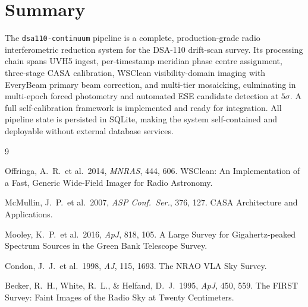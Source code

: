 \documentclass[12pt,a4paper]{article}
\begin{document}
\section{Summary}

The \texttt{dsa110-continuum} pipeline is a complete, production-grade radio
interferometric reduction system for the DSA-110 drift-scan survey.  Its
processing chain spans UVH5 ingest, per-timestamp meridian phase centre
assignment, three-stage CASA calibration, WSClean visibility-domain imaging
with EveryBeam primary beam correction, and multi-tier mosaicking, culminating
in multi-epoch forced photometry and automated ESE candidate detection at
$5\sigma$.  A full self-calibration framework is implemented and ready for
integration.  All pipeline state is persisted in SQLite, making the system
self-contained and deployable without external database services.

\begin{thebibliography}{9}

  Offringa, A.~R.\ et al.\ 2014,
  \textit{MNRAS}, 444, 606.
  WSClean: An Implementation of a Fast, Generic Wide-Field Imager for
  Radio Astronomy.

  McMullin, J.~P.\ et al.\ 2007,
  \textit{ASP Conf.\ Ser.}, 376, 127.
  CASA Architecture and Applications.

  Mooley, K.~P.\ et al.\ 2016,
  \textit{ApJ}, 818, 105.
  A Large Survey for Gigahertz-peaked Spectrum Sources in the Green
  Bank Telescope Survey.

  Condon, J.~J.\ et al.\ 1998,
  \textit{AJ}, 115, 1693.
  The NRAO VLA Sky Survey.

  Becker, R.~H., White, R.~L., \& Helfand, D.~J.\ 1995,
  \textit{ApJ}, 450, 559.
  The FIRST Survey: Faint Images of the Radio Sky at Twenty Centimeters.

\end{thebibliography}
\end{document}
